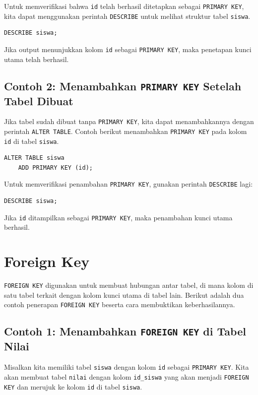 Untuk memverifikasi bahwa \texttt{id} telah berhasil ditetapkan sebagai \texttt{PRIMARY KEY}, kita dapat menggunakan perintah \texttt{DESCRIBE} untuk melihat struktur tabel \texttt{siswa}.

\begin{lstlisting}[style=sql]
	DESCRIBE siswa;
\end{lstlisting}

Jika output menunjukkan kolom \texttt{id} sebagai \texttt{PRIMARY KEY}, maka penetapan kunci utama telah berhasil.

\subsection*{Contoh 2: Menambahkan \texttt{PRIMARY KEY} Setelah Tabel Dibuat}
Jika tabel sudah dibuat tanpa \texttt{PRIMARY KEY}, kita dapat menambahkannya dengan perintah \texttt{ALTER TABLE}. Contoh berikut menambahkan \texttt{PRIMARY KEY} pada kolom \texttt{id} di tabel \texttt{siswa}.

\begin{lstlisting}[style=sql]
	ALTER TABLE siswa
	ADD PRIMARY KEY (id);
\end{lstlisting}

Untuk memverifikasi penambahan \texttt{PRIMARY KEY}, gunakan perintah \texttt{DESCRIBE} lagi:

\begin{lstlisting}[style=sql]
	DESCRIBE siswa;
\end{lstlisting}

Jika \texttt{id} ditampilkan sebagai \texttt{PRIMARY KEY}, maka penambahan kunci utama berhasil.

\section{Foreign Key}

\texttt{FOREIGN KEY} digunakan untuk membuat hubungan antar tabel, di mana kolom di satu tabel terkait dengan kolom kunci utama di tabel lain. Berikut adalah dua contoh penerapan \texttt{FOREIGN KEY} beserta cara membuktikan keberhasilannya.

\subsection*{Contoh 1: Menambahkan \texttt{FOREIGN KEY} di Tabel Nilai}
Misalkan kita memiliki tabel \texttt{siswa} dengan kolom \texttt{id} sebagai \texttt{PRIMARY KEY}. Kita akan membuat tabel \texttt{nilai} dengan kolom \texttt{id\_siswa} yang akan menjadi \texttt{FOREIGN KEY} dan merujuk ke kolom \texttt{id} di tabel \texttt{siswa}.

